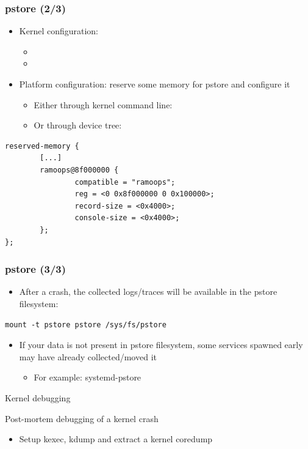 \begin{frame}[fragile]
  \frametitle{pstore (2/3)}
	\begin{itemize}
    \item Kernel configuration:
      \begin{itemize}
        \item {}
        \item {}
      \end{itemize}
	\item Platform configuration: reserve some memory for pstore and
    configure it
    \begin{itemize}
      \item Either through kernel command line:
      \item Or through device tree:
    \end{itemize}
  \end{itemize}
  \begin{block}{}
    \begin{verbatim}
reserved-memory {
        [...]
        ramoops@8f000000 {
                compatible = "ramoops";
                reg = <0 0x8f000000 0 0x100000>;
                record-size = <0x4000>;
                console-size = <0x4000>;
        };
};
    \end{verbatim}
  \end{block}
\end{frame}

\begin{frame}[fragile]
  \frametitle{pstore (3/3)}
  \begin{itemize}
    \item After a crash, the collected logs/traces will be available in the
      pstore filesystem:
  \end{itemize}
  \begin{block}{}
    \begin{verbatim}
mount -t pstore pstore /sys/fs/pstore
    \end{verbatim}
  \end{block}
  \begin{itemize}
    \item If your data is not present in pstore filesystem, some services
      spawned early may have already collected/moved it 
        \begin{itemize}
          \item For example: systemd-pstore
        \end{itemize}
  \end{itemize}
\end{frame}

\setuplabframe
{Kernel debugging}
{
  Post-mortem debugging of a kernel crash
  \begin{itemize}
    \item Setup kexec, kdump and extract a kernel coredump
  \end{itemize}
}
